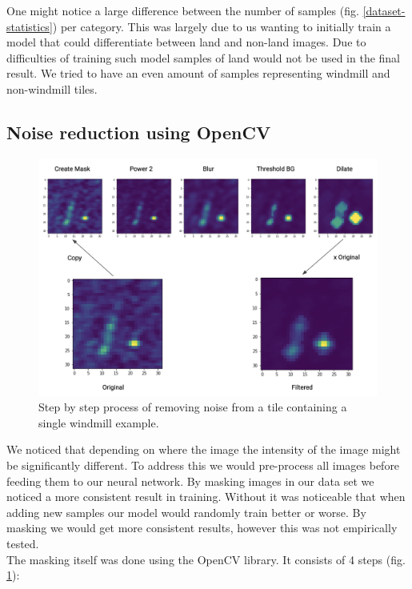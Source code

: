 One might notice a large difference between the number of samples (fig. \ref{dataset-statistics}) per category. This was largely due to us wanting to initially train a model that could differentiate between land and non-land images. Due to difficulties of training such model samples of land would not be used in the final result. We tried to have an even amount of samples representing windmill and non-windmill tiles.

\subsection{Noise reduction using OpenCV}

\begin{figure}[ht]
\begin{center}
\centerline{\includegraphics[width=\columnwidth]{images/noise-reduction.png}}
\caption{Step by step process of removing noise from a tile containing a single windmill example.}
\label{noise-reduction}
\end{center}
\end{figure}

We noticed that depending on where the image the intensity of the image might be significantly different. To address this we would pre-process all images before feeding them to our neural network. By masking images in our data set we noticed a more consistent result in training. Without it was noticeable that when adding new samples our model would randomly train better or worse. By masking we would get more consistent results, however this was not empirically tested.\\

The masking itself was done using the OpenCV library. It consists of 4 steps (fig. \ref{noise-reduction}):

